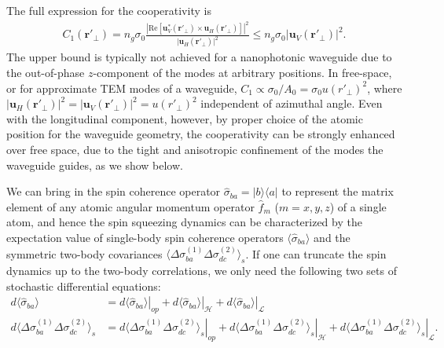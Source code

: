 \documentclass[preprint,aps,pra,onecolumn,superscriptaddress]{revtex4-1} %
\def\bra#1{\langle{#1}\rvert}%
\def\ket#1{\lvert{#1}\rangle}%
\newcommand{\mbf}[1]{\mathbf{#1}}
\newcommand{\expect}[1]{\big\langle #1 \big\rangle}
\newcommand{\Ai}{A_0} %
\begin{document}
The full expression for the cooperativity is
\begin{align}\label{eq:c1_bound}
C_1(\mbf{r}'_\perp) = n_g\sigma_0\frac{ \left\vert \text{Re} \left[ \mbf{u}^*_V (\mbf{r}'_\perp) \times \mbf{u}_H (\mbf{r}'_\perp) \right]\right\vert^2}{\vert \mbf{u}_H (\mbf{r}'_\perp) \vert ^2} \le n_g  \sigma_0 \vert \mbf{u}_V (\mbf{r}'_\perp) \vert ^2.
\end{align}
The upper bound is typically not achieved for a nanophotonic waveguide due to the out-of-phase $z $-component of the modes at arbitrary positions.  In free-space, or for approximate TEM modes of a waveguide, $ C_1\propto\sigma_0/\Ai=\sigma_0 u(r'_\perp)^2$, where $ \vert \mbf{u}_H (\mbf{r}'_\perp) \vert ^2=\vert \mbf{u}_V (\mbf{r}'_\perp) \vert ^2 = u(r'_\perp)^2 $ independent of azimuthal angle. 
Even with the longitudinal component, however, by proper choice of the atomic position for the waveguide geometry, the cooperativity can be strongly enhanced over free space, due to the tight and anisotropic confinement of the modes the waveguide guides,  as we  show below.

We can bring in the spin coherence operator $\hat{\sigma}_{ba}=\ket{b}\bra{a}$ to represent the matrix element of any atomic angular momentum operator $ \hat{f}_m $ ($ m=x,y,z $) of a single atom, and hence the spin squeezing dynamics can be characterized by the expectation value of single-body spin coherence operators $\expect{\hat{\sigma}_{ba}}$ and the symmetric two-body covariances $\expect{\Delta \sigma_{ba}^{(1)}\Delta\sigma_{dc}^{(2)} }_s$. 
If one can truncate the spin dynamics up to the two-body correlations, we only need the following two sets of stochastic differential equations:
\begin{subequations}
\begin{align}
d\expect{\hat{\sigma}_{ba}} &=\left. d{\expect{\hat{\sigma}_{ba}}}\right|_{op} + \left. d{\expect{\hat{\sigma}_{ba}}}\right|_{\mathcal{H}}+\left. d{\expect{\hat{\sigma}_{ba}}}\right|_{\mathcal{L}} \\
d\expect{\Delta \sigma_{ba}^{(1)}\Delta \sigma_{dc}^{(2)}}_s &= \left. d{\expect{\Delta \sigma_{ba}^{(1)}\Delta \sigma_{dc}^{(2)}}_s}\right|_{op} + \left. d{\expect{\Delta \sigma_{ba}^{(1)}\Delta \sigma_{dc}^{(2)}}_s}\right|_{\mathcal{H}} + \left. d{\expect{\Delta \sigma_{ba}^{(1)}\Delta \sigma_{dc}^{(2)}}_s}\right|_{\mathcal{L}}.
\end{align}
\end{subequations}
\end{document}
